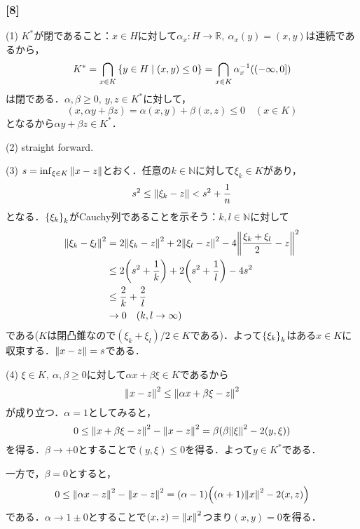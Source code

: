 \documentclass[a4j]{ltjsarticle}
\newcommand{\Rset}{\mathbb{R}}
\newcommand{\Nset}{\mathbb{N}}
\newcommand{\1}{\mathbbm{1}}
\numberwithin{equation}{section}
\theoremstyle{definition}
\begin{document}
\subsubsection*{[8]}
(1) $K^\ast$が閉であること：$x\in H$に対して$\alpha_x\colon H\to \Rset,\ \alpha_x(y)=(x,y)$は連続であるから，
\begin{equation}
    K^\ast=\bigcap_{x\in K} \qty{y\in H\mid (x,y)\leq 0}=\bigcap_{x\in K} \alpha_{x}^{-1}((-\infty,0])
\end{equation}
は閉である．$\alpha,\beta\geq0,\ y,z\in K^\ast$に対して，
\begin{equation}
    (x,\alpha y+\beta z)=\alpha(x,y)+\beta(x,z)\leq 0\quad (x\in K)
\end{equation}
となるから$\alpha y+\beta z\in K^\ast$．

(2) straight forward.

(3) $s=\inf_{\xi\in K}\norm{x-z}$とおく．任意の$k\in\Nset$に対して$\xi_k\in K$があり，
\begin{equation}
    s^2\leq \norm{\xi_k-z}<s^2+\frac{1}{n}
\end{equation}
となる．$\qty{\xi_k}_k$がCauchy列であることを示そう：$k,l\in\Nset$に対して
\begin{align}
    \norm{\xi_k-\xi_l}^2
    &=2\norm{\xi_k-z}^2+2\norm{\xi_l-z}^2-4\norm{\frac{\xi_k+\xi_l}{2}-z}^2\\
    &\leq 2\qty(s^2+\frac{1}{k})+2\qty(s^2+\frac{1}{l})-4s^2\\
    &\leq \frac{2}{k}+\frac{2}{l}\\
    &\to0\quad (k,l\to\infty)
\end{align}
である($K$は閉凸錐なので$(\xi_k+\xi_l)/2\in K$である)．よって$\qty{\xi_k}_k$はある$x\in K$に収束する．$\norm{x-z}=s$である．

(4) $\xi\in K,\ \alpha,\beta\geq0$に対して$\alpha x+\beta\xi\in K$であるから
\begin{equation}
    \norm{x-z}^2\leq \norm{\alpha x+\beta \xi-z}^2 
\end{equation}
が成り立つ．$\alpha=1$としてみると，
\begin{equation}
    0\leq \norm{x+\beta\xi-z}^2-\norm{x-z}^2=\beta(\beta\norm{\xi}^2-2(y,\xi))
\end{equation}
を得る．$\beta\to +0$とすることで$(y,\xi)\leq 0$を得る．よって$y\in K^\ast$である．

一方で，$\beta=0$とすると，
\begin{equation}
    0\leq \norm{\alpha x-z}^2-\norm{x-z}^2=\qty(\alpha-1)\qty((\alpha+1)\norm{x}^2-2(x,z))
\end{equation}
である．$\alpha\to1\pm 0$とすることで$(x,z)=\norm{x}^2$つまり$(x,y)=0$を得る．
\end{document}
